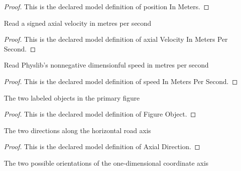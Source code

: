 \begin{proof}
  This is the declared model definition of position In Meters.
\end{proof}
\begin{definition}
  \label{def:physics:phyx-mini-0195:phyxminiproblems-problemphyxmini0195-axialvelocityinmeterspersecond}
  Read a signed axial velocity in metres per second
\end{definition}
\begin{proof}
  This is the declared model definition of axial Velocity In Meters Per Second.
\end{proof}
\begin{definition}
  \label{def:physics:phyx-mini-0195:phyxminiproblems-problemphyxmini0195-speedinmeterspersecond}
  Read Physlib's nonnegative dimensionful speed in metres per second
\end{definition}
\begin{proof}
  This is the declared model definition of speed In Meters Per Second.
\end{proof}
\begin{definition}
  \label{def:physics:phyx-mini-0195:phyxminiproblems-problemphyxmini0195-figureobject}
  The two labeled objects in the primary figure
\end{definition}
\begin{proof}
  This is the declared model definition of Figure Object.
\end{proof}
\begin{definition}
  \label{def:physics:phyx-mini-0195:phyxminiproblems-problemphyxmini0195-axialdirection}
  The two directions along the horizontal road axis
\end{definition}
\begin{proof}
  This is the declared model definition of Axial Direction.
\end{proof}
\begin{definition}
  \label{def:physics:phyx-mini-0195:phyxminiproblems-problemphyxmini0195-axisorientation}
  The two possible orientations of the one-dimensional coordinate axis
\end{definition}

